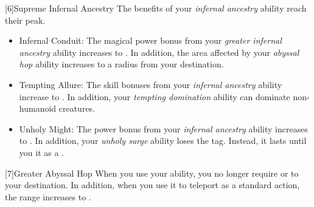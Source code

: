         [6]{Supreme Infernal Ancestry} The benefits of your \textit{infernal ancestry} ability reach their peak.
        \begin{itemize}
            \item Infernal Conduit: The magical power bonus from your \textit{greater infernal ancestry} ability increases to .
                In addition, the area affected by your \textit{abyssal hop} ability increases to a \medarea radius from your destination.
            \item Tempting Allure: The skill bonuses from your \textit{infernal ancestry} ability increase to .
                In addition, your \textit{tempting domination} ability can dominate non-humanoid creatures.
            \item Unholy Might: The power bonus from your \textit{infernal ancestry} ability increases to .
                In addition, your \textit{unholy surge} ability loses the  tag.
                Instead, it lasts until you  it as a .
        \end{itemize}

        [7]{Greater Abyssal Hop} When you use your  ability, you no longer require  or  to your destination.
        In addition, when you use it to teleport as a standard action, the range increases to \distrange.




